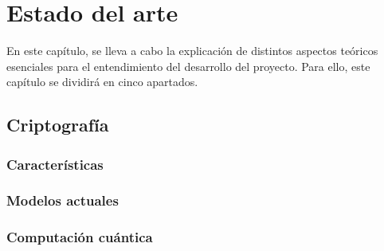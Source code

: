 %
%
%
% 
%
%
%
%

\chapter{Estado del arte}\label{cha:estado-arte}

En este capítulo, se lleva a cabo la explicación de distintos aspectos teóricos esenciales para el entendimiento del desarrollo del proyecto.
Para ello, este capítulo se dividirá en cinco apartados.

\section{Criptografía}\label{sec:criptografia}


\subsection{Características}\label{subsec:caracteristicas}


\subsection{Modelos actuales}\label{subsec:mod_act}


\subsection{Computación cuántica}\label{subsec:cuantica}

